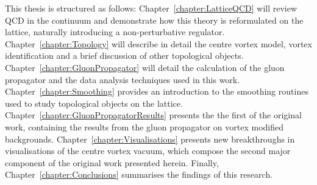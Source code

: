 This thesis is structured as follows: Chapter~\ref{chapter:LatticeQCD} will review QCD in the continuum and demonstrate how this theory is reformulated on the lattice, naturally introducing a non-perturbative regulator. Chapter~\ref{chapter:Topology} will describe in detail the centre vortex model, vortex identification and a brief discussion of other topological objects. Chapter~\ref{chapter:GluonPropagator} will detail the calculation of the gluon propagator and the data analysis techniques used in this work. Chapter~\ref{chapter:Smoothing} provides an introduction to the smoothing routines used to study topological objects on the lattice. Chapter~\ref{chapter:GluonPropagatorResults} presents the the first of the original work, containing the results from the gluon propagator on vortex modified backgrounds.  Chapter~\ref{chapter:Visualisations} presents new breakthroughs in visualisations of the centre vortex vacuum, which compose the second major component of the original work presented herein. Finally, Chapter~\ref{chapter:Conclusions} summarises the findings of this research.